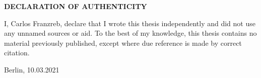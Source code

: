 \begin{center}
  \textbf{DECLARATION OF AUTHENTICITY}
\end{center}
I, Carlos Franzreb, declare that I wrote this thesis independently and did not use any unnamed sources or aid. To the best of my knowledge, this thesis contains no material previously published, except where due reference is made by correct citation.

\vskip 2cm

Berlin, 10.03.2021